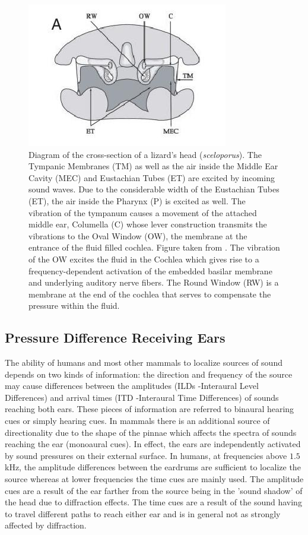 \begin{figure}[ht]
 \centering
 \includegraphics[width=0.45\linewidth]{Diagrams/lizardheadcrosssection.jpeg}
 \caption[Cross Section of a Lizards Head]{Diagram of the cross-section of a lizard’s head (\emph{sceloporus}). The Tympanic Membranes (TM) as well as
 the air inside the Middle Ear Cavity (MEC) and Eustachian Tubes (ET) are excited by incoming sound waves. Due to the considerable width of the Eustachian Tubes (ET), the air inside the Pharynx (P) is excited as well.
 The vibration of the tympanum causes a movement of the attached middle ear, Columella (C) whose lever construction transmits the vibrations to the Oval Window (OW), the membrane at the entrance of the fluid filled cochlea.
 Figure taken from \cite{dalsgaardmanley1}. The vibration of the OW excites the fluid in the Cochlea which gives rise to a frequency-dependent activation of the embedded basilar membrane and underlying
 auditory nerve fibers. The Round Window (RW) is a membrane at the end of the cochlea that serves to compensate the pressure within the fluid.}
 \label{lizardheadcrosssection}
\end{figure}

\subsection{Pressure Difference Receiving Ears}\label{iceintrosection}
The ability of humans and most other mammals to localize sources of sound depends on two kinds of information: the direction and frequency
of the source may cause differences between the amplitudes (ILDs -Interaural Level Differences) and arrival times (ITD -Interaural Time Differences) of sounds reaching both ears. These pieces of information are
referred to binaural hearing cues or simply hearing cues. In mammals there is an additional source of directionality due to the shape
of the pinnae which affects the spectra of sounds reaching the ear (monoaural cues). In effect, the ears are independently activated by sound pressures
on their external surface. In humans, at frequencies above $1.5$kHz, the amplitude differences between the eardrums are sufficient
to localize the source whereas at lower frequencies the time cues are mainly used. The amplitude cues are a result of the ear farther
from the source being in the 'sound shadow' of the head due to diffraction effects. The time cues are a result of the sound having to travel
different paths to reach either ear and is in general not as strongly affected by diffraction.

